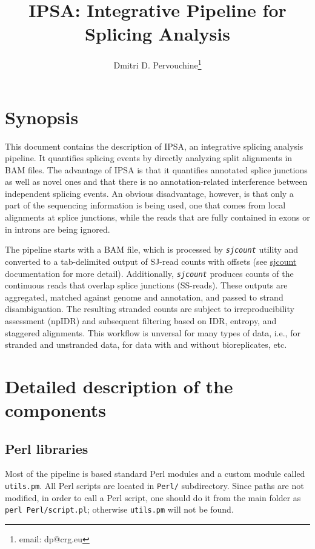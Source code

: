 \documentclass{article}
\newcommand{\prog}[1]{{\tt\em #1}}
\begin{document}
\title{IPSA: Integrative Pipeline for Splicing Analysis}
\author{Dmitri D. Pervouchine\thanks{email: dp@crg.eu}}

\maketitle
\tableofcontents

\section{Synopsis}
This document contains the description of IPSA, an integrative splicing analysis pipeline. 
It quantifies splicing events by directly analyzing split alignments in BAM files. 
The advantage of IPSA is that it quantifies annotated splice junctions as well as novel ones and that there is no annotation-related interference between 
independent splicing events. An obvious disadvantage, however, is that only a part of the 
sequencing information is being used, one that comes from local alignments at splice junctions, 
while the reads that are fully contained in exons or in introns are  being ignored.

The pipeline starts with a BAM file, which is processed by \prog{sjcount} utility and converted to a tab-delimited 
output of SJ-read counts with offsets (see \href{https://github.com/pervouchine/sjcount}{sjcount} documentation 
for more detail). Additionally, \prog{sjcount} produces counts of the continuous reads that overlap splice junctions (SS-reads).
These outputs are aggregated, matched against genome and annotation, and passed to strand disambiguation.
The resulting stranded counts are subject to irreproducibility assessment (npIDR) and subsequent filtering 
based on IDR, entropy, and staggered alignments. This workflow is unversal for many types of data, i.e., for stranded 
and unstranded data, for data with and without bioreplicates, etc.



\section{Detailed description of the components}

\subsection{Perl libraries}
Most of the pipeline is based standard Perl modules and a custom module called {\tt utils.pm}. All Perl scripts are located in {\tt Perl/} subdirectory.
Since paths are not modified, in order to call a Perl script, one should do it from the main folder as {\tt perl Perl/script.pl}; otherwise {\tt utils.pm}
will not be found.
\end{document}
